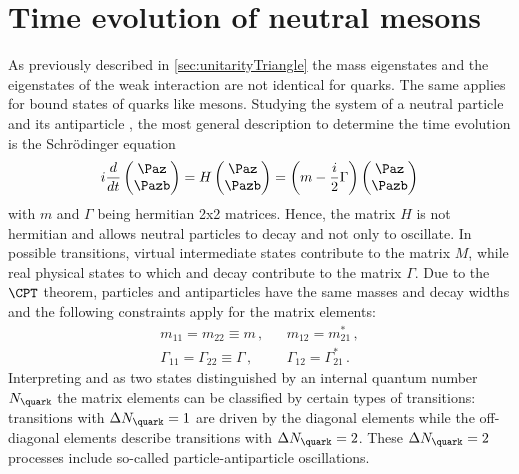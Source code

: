 \newpage

\section[head={Time evolution of neutral mesons},tocentry={Time evolution of neutral mesons}]{Time evolution of neutral mesons}
\label{sec:TimeEvolution}

As previously described in \cref{sec:unitarityTriangle} the mass eigenstates and the eigenstates of the weak interaction are not identical for quarks.
The same applies for bound states of quarks like \B mesons.
Studying the system of a neutral particle \Paz and its antiparticle \Pazb, the most general description to determine the time evolution is the Schrödinger equation
\begin{equation}
i\frac{d}{d{}t}\begin{pmatrix} \Paz \\ \Pazb \end{pmatrix} = H \begin{pmatrix} \Paz \\ \Pazb \end{pmatrix}
=\left(m-\frac{i}{2}\Gamma\right)\begin{pmatrix} \Paz \\ \Pazb \end{pmatrix} \label{eq:mixMatrix}
\end{equation}
with $m$ and $\Gamma$ being hermitian 2x2 matrices.
Hence, the matrix $H$ is not hermitian and allows neutral particles \Paz to decay and not only to oscillate.
In possible transitions, virtual intermediate states contribute to the matrix $M$, while real physical states to which \Paz and \Pazb decay contribute to the matrix $\Gamma$.
Due to the $\CPT$ theorem, particles and antiparticles have the same masses and decay widths and the following constraints apply for the matrix elements:
\begin{equation}
\begin{aligned}
&m_{11}=m_{22}\equiv m\,,&&m_{12}=m_{21}^\ast\,,&\\
&\Gamma_{11}=\Gamma_{22}\equiv\Gamma\,,&&\Gamma_{12}=\Gamma_{21}^\ast\,.&
\end{aligned}
\end{equation}
Interpreting \Paz and \Pazb as two states distinguished by an internal quantum number $N_\quark$ the matrix elements can be classified by certain types of transitions:
transitions with $\Delta N_\quark=1$ are driven by the diagonal elements while the off-diagonal elements describe transitions with $\Delta N_\quark=2$.
These $\Delta N_\quark=2$ processes include so-called particle-antiparticle oscillations.


